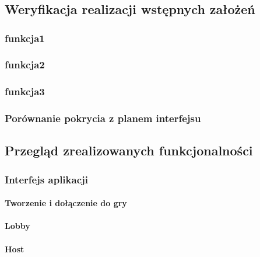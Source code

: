 \chapter{\ChapterTitleResults}
\label{sec:wyniki-projektu}

\section{Weryfikacja realizacji wstępnych założeń}

\subsection{funkcja1}
\subsection{funkcja2}
\subsection{funkcja3}

\subsection{Porównanie pokrycia z planem interfejsu}


\section{Przegląd zrealizowanych funkcjonalności}

\subsection{Interfejs aplikacji}

\subsubsection{Tworzenie i dołączenie do gry}
\subsubsection{Lobby}
\subsubsection{Host}
